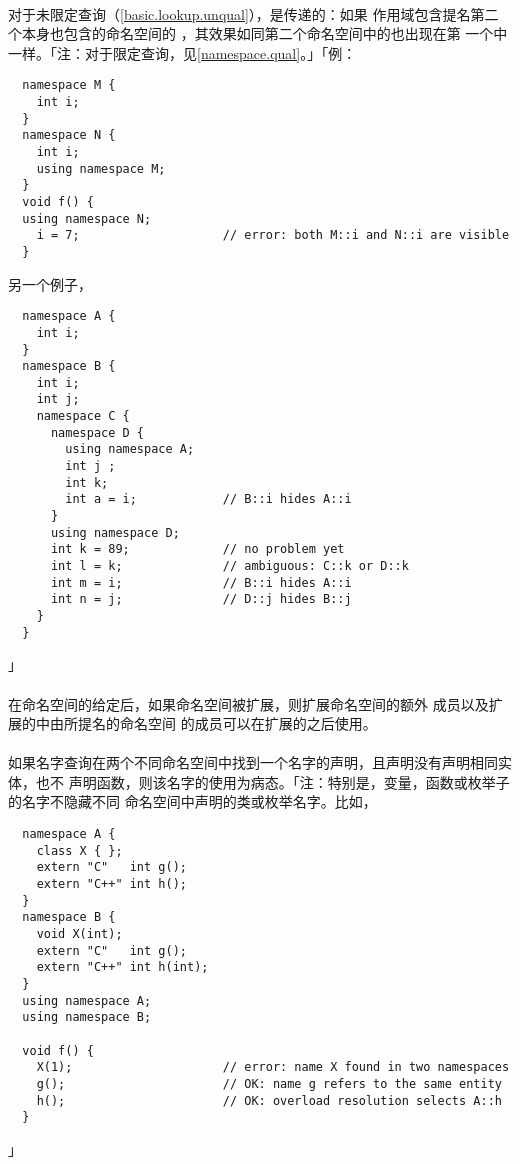 \paragraph{}
对于未限定查询（\ref{basic.lookup.unqual}），是传递的：如果
作用域包含提名第二个本身也包含的命名空间的
，其效果如同第二个命名空间中的也出现在第
一个中一样。「注：对于限定查询，见\ref{namespace.qual}。」「例：
\begin{lstlisting}
  namespace M {
    int i;
  }
  namespace N {
    int i;
    using namespace M;
  }
  void f() {
  using namespace N;
    i = 7;                    // error: both M::i and N::i are visible
  }
\end{lstlisting}
另一个例子，
\begin{lstlisting}
  namespace A {
    int i;
  }
  namespace B {
    int i;
    int j;
    namespace C {
      namespace D {
        using namespace A;
        int j ;
        int k;
        int a = i;            // B::i hides A::i
      }
      using namespace D;
      int k = 89;             // no problem yet
      int l = k;              // ambiguous: C::k or D::k
      int m = i;              // B::i hides A::i
      int n = j;              // D::j hides B::j
    }
  }
\end{lstlisting}」

\paragraph{}
在命名空间的给定后，如果命名空间被扩展，则扩展命名空间的额外
成员以及扩展的中由所提名的命名空间
的成员可以在扩展的之后使用。

\paragraph{}
如果名字查询在两个不同命名空间中找到一个名字的声明，且声明没有声明相同实体，也不
声明函数，则该名字的使用为病态。「注：特别是，变量，函数或枚举子的名字不隐藏不同
命名空间中声明的类或枚举名字。比如，
\begin{lstlisting}
  namespace A {
    class X { };
    extern "C"   int g();
    extern "C++" int h();
  }
  namespace B {
    void X(int);
    extern "C"   int g();
    extern "C++" int h(int);
  }
  using namespace A;
  using namespace B;

  void f() {
    X(1);                     // error: name X found in two namespaces
    g();                      // OK: name g refers to the same entity
    h();                      // OK: overload resolution selects A::h
  }
\end{lstlisting}」

